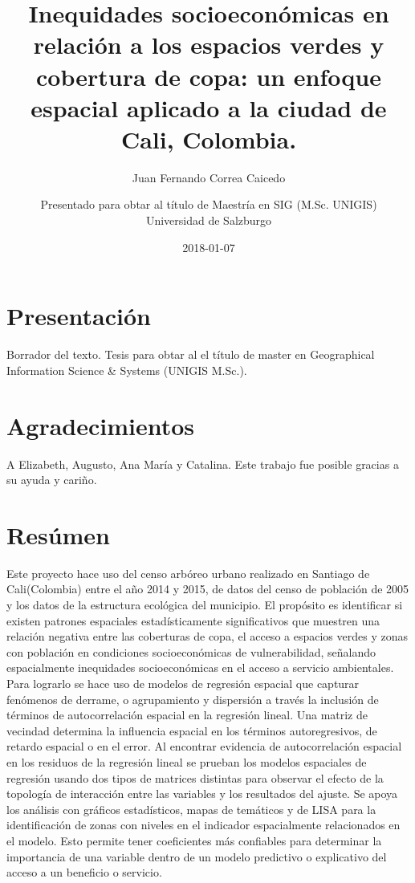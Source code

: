 \documentclass[12pt,]{book}
\title{Inequidades socioeconómicas en relación a los espacios verdes y
cobertura de copa: un enfoque espacial aplicado a la ciudad de Cali,
Colombia.}
\subtitle{Juan Fernando Correa Caicedo}
\author{Presentado para obtar al título de Maestría en SIG (M.Sc. UNIGIS) \\ Universidad de Salzburgo}
\date{2018-01-07}
\begin{document}
\maketitle

{
\setcounter{tocdepth}{1}
\tableofcontents
}
\listoftables
\listoffigures
\chapter*{Presentación}\label{presentacion}

Borrador del texto. Tesis para obtar al el título de master en
Geographical Information Science \& Systems (UNIGIS M.Sc.).

\chapter*{Agradecimientos}\label{agradecimientos}

A Elizabeth, Augusto, Ana María y Catalina. Este trabajo fue posible
gracias a su ayuda y cariño.

\chapter*{Resúmen}\label{resumen}

Este proyecto hace uso del censo arbóreo urbano realizado en Santiago de
Cali(Colombia) entre el año 2014 y 2015, de datos del censo de población
de 2005 y los datos de la estructura ecológica del municipio. El
propósito es identificar si existen patrones espaciales estadísticamente
significativos que muestren una relación negativa entre las coberturas
de copa, el acceso a espacios verdes y zonas con población en
condiciones socioeconómicas de vulnerabilidad, señalando espacialmente
inequidades socioeconómicas en el acceso a servicio ambientales. Para
lograrlo se hace uso de modelos de regresión espacial que capturar
fenómenos de derrame, o agrupamiento y dispersión a través la inclusión
de términos de autocorrelación espacial en la regresión lineal. Una
matriz de vecindad determina la influencia espacial en los términos
autoregresivos, de retardo espacial o en el error. Al encontrar
evidencia de autocorrelación espacial en los residuos de la regresión
lineal se prueban los modelos espaciales de regresión usando dos tipos
de matrices distintas para observar el efecto de la topología de
interacción entre las variables y los resultados del ajuste. Se apoya
los análisis con gráficos estadísticos, mapas de temáticos y de LISA
para la identificación de zonas con niveles en el indicador
espacialmente relacionados en el modelo. Esto permite tener coeficientes
más confiables para determinar la importancia de una variable dentro de
un modelo predictivo o explicativo del acceso a un beneficio o servicio.
\end{document}
